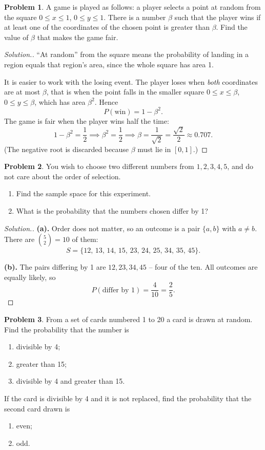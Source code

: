 \documentclass[12pt,a4paper]{report}
\theoremstyle{definition}
\theoremstyle{plain}
\theoremstyle{definition}
\newtheorem{problemx}{Problem}[section]
\newenvironment{problem}{\begin{problemx}}{\end{problemx}}
\newenvironment{solution}
  {\renewcommand{\qedsymbol}{}\begin{proof}[\textit{Solution}.]}
  {\end{proof}}
\begin{document}
\begin{problem}
A game is played as follows: a player selects a point at random from the square
$0\leq x\leq 1$, $0\leq y\leq 1$. There is a number $\beta$ such that the player wins if
at least one of the coordinates of the chosen point is greater than $\beta$. Find the
value of $\beta$ that makes the game fair.
\end{problem}

\begin{solution}
``At random'' from the square means the probability of landing in a region equals that
region's area, since the whole square has area 1.

It is easier to work with the losing event. The player loses when \emph{both} coordinates
are at most $\beta$, that is when the point falls in the smaller square
$0\leq x\leq\beta$, $0\leq y\leq\beta$, which has area $\beta^{2}$. Hence
\[P(\text{win}) = 1 - \beta^{2}.\]
The game is fair when the player wins half the time:
\[1-\beta^{2} = \frac{1}{2} \implies \beta^{2} = \frac{1}{2}
 \implies \beta = \frac{1}{\sqrt{2}} = \frac{\sqrt{2}}{2} \approx 0.707.\]
(The negative root is discarded because $\beta$ must lie in $[0,1]$.)
\end{solution}

\begin{problem}
You wish to choose two different numbers from $1, 2, 3, 4, 5$, and do not care about
the order of selection.
\begin{enumerate}
\item[(a).] Find the sample space for this experiment.
\item[(b).] What is the probability that the numbers chosen differ by 1?
\end{enumerate}
\end{problem}

\begin{solution}
\textbf{(a).} Order does not matter, so an outcome is a pair $\{a,b\}$ with $a\neq b$.
There are $\binom{5}{2}=10$ of them:
\[S = \{12,\,13,\,14,\,15,\,23,\,24,\,25,\,34,\,35,\,45\}.\]

\textbf{(b).} The pairs differing by 1 are $12, 23, 34, 45$ -- four of the ten. All
outcomes are equally likely, so
\[P(\text{differ by }1) = \frac{4}{10} = \frac{2}{5}.\]
\end{solution}

\begin{problem}
From a set of cards numbered 1 to 20 a card is drawn at random. Find the probability
that the number is
\begin{enumerate}
\item[(a).] divisible by 4;
\item[(b).] greater than 15;
\item[(c).] divisible by 4 and greater than 15.
\end{enumerate}
If the card is divisible by 4 and it is not replaced, find the probability that the
second card drawn is
\begin{enumerate}
\item[(d).] even;
\item[(e).] odd.
\end{enumerate}
\end{problem}
\end{document}
